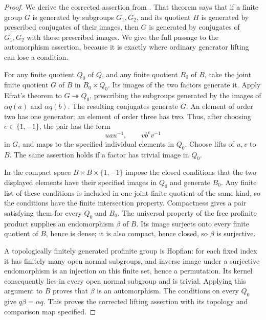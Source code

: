 \begin{proof}
We derive the corrected assertion from
\citet[Main Theorem, pp.~2217--2219]{B_Efrat1997}.
That theorem says that if a finite group $G$ is generated by
subgroups $G_1,G_2$, and its quotient $H$ is generated by prescribed
conjugates of their images, then $G$ is generated by conjugates
of $G_1,G_2$ with those prescribed images. We give the full
passage to the automorphism assertion, because it is exactly
where ordinary generator lifting can lose a condition.

For any finite quotient $Q_0$ of $Q$, and any finite quotient
$B_0$ of $B$, take the joint finite quotient $G$ of $B$ in
$B_0\times Q_0$. Its images of the two factors generate it.
Apply Efrat's theorem to $G\twoheadrightarrow Q_0$, prescribing
the subgroups generated by the images of $\alpha q(a)$ and
$\alpha q(b)$. The resulting conjugates generate $G$.
An element of order two has one generator; an element of order
three has two. Thus, after choosing $e\in\{1,-1\}$, the pair
has the form
\[
          uau^{-1},\qquad vb^ev^{-1}
\]
in $G$, and maps to the specified individual elements in $Q_0$.
Choose lifts of $u,v$ to $B$. The same assertion holds if a
factor has trivial image in $Q_0$.

In the compact space $B\times B\times\{1,-1\}$ impose the
closed conditions that the two displayed elements have their
specified images in $Q_0$ and generate $B_0$. Any finite list
of these conditions is included in one joint finite quotient
of the same kind, so the conditions have the finite intersection
property. Compactness gives a pair satisfying them for every
$Q_0$ and $B_0$. The universal property of the free profinite
product supplies an endomorphism $\beta$ of $B$. Its image
surjects onto every finite quotient of $B$, hence is dense;
it is also compact, hence closed, so $\beta$ is surjective.

A topologically finitely generated profinite group is Hopfian:
for each fixed index it has finitely many open normal subgroups,
and inverse image under a surjective endomorphism is an injection
on this finite set, hence a permutation. Its kernel consequently
lies in every open normal subgroup and is trivial. Applying
this argument to $B$ proves that $\beta$ is an automorphism.
The conditions on every $Q_0$ give $q\beta=\alpha q$.
This proves the corrected lifting assertion with its topology
and comparison map specified.


\end{proof}

